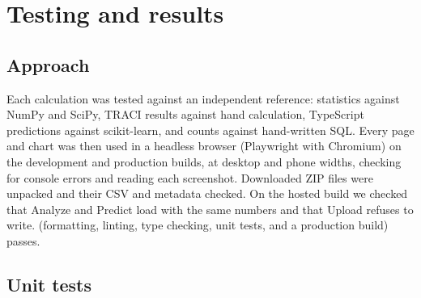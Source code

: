 \documentclass[11pt,a4paper]{article}
\begin{document}
\section{Testing and results}
\label{sec:testing}

\subsection{Approach}

Each calculation was tested against an independent reference: statistics against NumPy and
SciPy, TRACI results against hand calculation, TypeScript predictions against scikit-learn, and
counts against hand-written SQL. Every page and chart was then used in a headless browser
(Playwright with Chromium) on the development and production builds, at desktop and phone
widths, checking for console errors and reading each screenshot. Downloaded ZIP files were
unpacked and their CSV and metadata checked. On the hosted build we checked that Analyze and
Predict load with the same numbers and that Upload refuses to write.
 (formatting, linting, type checking, unit tests, and a production build)
passes.

\subsection{Unit tests}
\end{document}
